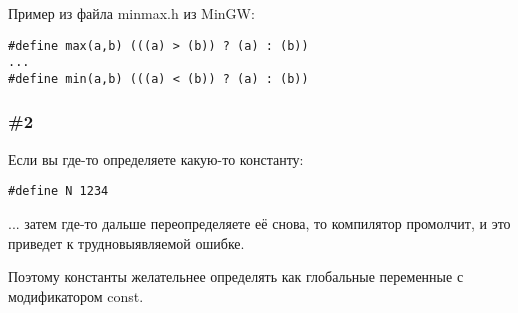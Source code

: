 Пример из файла minmax.h из MinGW:

\begin{lstlisting}
#define max(a,b) (((a) > (b)) ? (a) : (b))
...
#define min(a,b) (((a) < (b)) ? (a) : (b))
\end{lstlisting}

\subsubsection{\#2}

Если вы где-то определяете какую-то константу:

\begin{lstlisting}
#define N 1234
\end{lstlisting}

... затем где-то дальше переопределяете её снова, то компилятор промолчит, и это приведет к трудновыявляемой
ошибке.

Поэтому константы желательнее определять как глобальные переменные с модификатором const.


